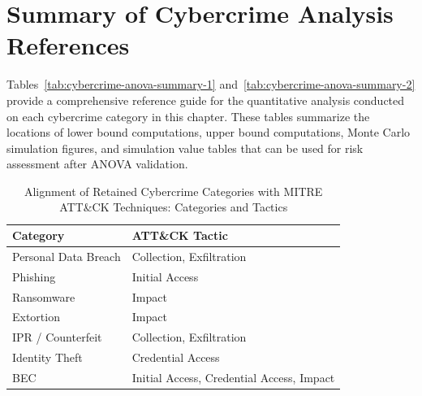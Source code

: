 \section{Summary of Cybercrime Analysis References}

Tables~\ref{tab:cybercrime-anova-summary-1} and~\ref{tab:cybercrime-anova-summary-2} provide a comprehensive reference guide for the quantitative analysis conducted on each \gls{cybercrime} category in this chapter. These tables summarize the locations of lower bound computations, upper bound computations, Monte Carlo simulation figures, and simulation value tables that can be used for risk assessment after ANOVA validation.


\begin{table}[htbp]
\centering
\caption{Alignment of Retained Cybercrime Categories with MITRE ATT\&CK Techniques: Categories and Tactics}
\label{tab:attack_alignment_1}
\begin{tabular}{|p{3.5cm}|p{4.5cm}|}
\hline
\textbf{Category} & \textbf{ATT\&CK Tactic} \\
\hline
Personal Data Breach & Collection, Exfiltration \\
\hline
Phishing & Initial Access \\
\hline
Ransomware & Impact \\
\hline
Extortion & Impact \\
\hline
IPR / Counterfeit & Collection, Exfiltration \\
\hline
Identity Theft & Credential Access \\
\hline
BEC & Initial Access, Credential Access, Impact \\
\hline
\end{tabular}
\end{table}

